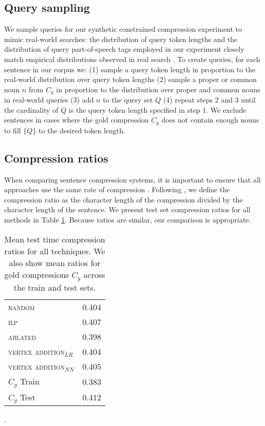 \subsection{Query sampling}
We sample queries for our synthetic constrained compression experiment to mimic real-world searches: the distribution of query token lengths and the distribution of query part-of-speech tags employed in our experiment closely match empirical distributions observed in real search \cite{Jansen2000RealLR,Barr2008TheLS}. To create queries, for each sentence in our corpus we: (1) sample a query token length in proportion to the real-world distribution over query token lengths (2) sample a proper or common noun $n$ from $C_g$ in proportion to the distribution over proper and common nouns in real-world queries (3) add $n$ to the query set $Q$ (4) repeat steps 2 and 3 until the cardinality of $Q$ is the query token length specified in step 1. We exclude sentences in cases where the gold compression $C_g$ does not contain enough nouns to fill $\{Q\}$ to the desired token length.


\subsection{Compression ratios}

When comparing sentence compression systems, it is important to ensure that all approaches use the same rate of compression \cite{napoles2011evaluating}. Following \citet{filippova2015sentence}, we define the compression ratio as the character length of the compression divided by the character length of the sentence. We present test set compression ratios for all methods in Table \ref{t:cr}. Because ratios are similar, our comparison is appropriate.

\begin{table}[htb!]
\centering
\begin{tabular}{@{}l | l@{}}
\textsc{random} & 0.404\\ 
\textsc{ilp} &  0.407 \\
\textsc{ablated} & 0.398 \\
\textsc{vertex addition}$_{LR}$ &  0.404  \\
\textsc{vertex addition}$_{NN}$ &  0.405  \\ \midrule
$C_g$ Train  & 0.383 \\
$C_g$ Test   & 0.412 \\
\end{tabular}
\caption{Mean test time compression ratios for all techniques. We also show mean ratios for gold compressions $C_g$ across the train and test sets.}\label{t:cr}.
\end{table}

